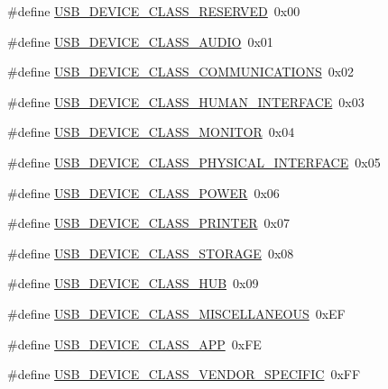 \begin{DoxyCompactItemize}
\item 
\#define \hyperlink{group__USBD__Core_gaca7ece737f3f37b7a6f458fc24864776}{U\-S\-B\-\_\-\-D\-E\-V\-I\-C\-E\-\_\-\-C\-L\-A\-S\-S\-\_\-\-R\-E\-S\-E\-R\-V\-E\-D}~0x00
\item 
\#define \hyperlink{group__USBD__Core_gade360faee3b601af707b65122a46d446}{U\-S\-B\-\_\-\-D\-E\-V\-I\-C\-E\-\_\-\-C\-L\-A\-S\-S\-\_\-\-A\-U\-D\-I\-O}~0x01
\item 
\#define \hyperlink{group__USBD__Core_gab6fd7e18adf5c748a6b56391c1c2b819}{U\-S\-B\-\_\-\-D\-E\-V\-I\-C\-E\-\_\-\-C\-L\-A\-S\-S\-\_\-\-C\-O\-M\-M\-U\-N\-I\-C\-A\-T\-I\-O\-N\-S}~0x02
\item 
\#define \hyperlink{group__USBD__Core_ga3d9e0560a81b4dfd30bbf829960dbfab}{U\-S\-B\-\_\-\-D\-E\-V\-I\-C\-E\-\_\-\-C\-L\-A\-S\-S\-\_\-\-H\-U\-M\-A\-N\-\_\-\-I\-N\-T\-E\-R\-F\-A\-C\-E}~0x03
\item 
\#define \hyperlink{group__USBD__Core_ga23d001aa49fada2019ff3a4886a9f2a5}{U\-S\-B\-\_\-\-D\-E\-V\-I\-C\-E\-\_\-\-C\-L\-A\-S\-S\-\_\-\-M\-O\-N\-I\-T\-O\-R}~0x04
\item 
\#define \hyperlink{group__USBD__Core_ga6053794e5de119b37615ec98f7eceedb}{U\-S\-B\-\_\-\-D\-E\-V\-I\-C\-E\-\_\-\-C\-L\-A\-S\-S\-\_\-\-P\-H\-Y\-S\-I\-C\-A\-L\-\_\-\-I\-N\-T\-E\-R\-F\-A\-C\-E}~0x05
\item 
\#define \hyperlink{group__USBD__Core_ga88a8b2d45b2950ffd5654e4c3b6741ff}{U\-S\-B\-\_\-\-D\-E\-V\-I\-C\-E\-\_\-\-C\-L\-A\-S\-S\-\_\-\-P\-O\-W\-E\-R}~0x06
\item 
\#define \hyperlink{group__USBD__Core_gae6181c6bdb18c0e6491dd189983b6bd2}{U\-S\-B\-\_\-\-D\-E\-V\-I\-C\-E\-\_\-\-C\-L\-A\-S\-S\-\_\-\-P\-R\-I\-N\-T\-E\-R}~0x07
\item 
\#define \hyperlink{group__USBD__Core_ga053d2a9c3c9856ee01589ebb64d2e09b}{U\-S\-B\-\_\-\-D\-E\-V\-I\-C\-E\-\_\-\-C\-L\-A\-S\-S\-\_\-\-S\-T\-O\-R\-A\-G\-E}~0x08
\item 
\#define \hyperlink{group__USBD__Core_gab8167347cb586d3f82a7ad95fa25bc22}{U\-S\-B\-\_\-\-D\-E\-V\-I\-C\-E\-\_\-\-C\-L\-A\-S\-S\-\_\-\-H\-U\-B}~0x09
\item 
\#define \hyperlink{group__USBD__Core_gabd79da65d7f8f58b37e402fa1442831a}{U\-S\-B\-\_\-\-D\-E\-V\-I\-C\-E\-\_\-\-C\-L\-A\-S\-S\-\_\-\-M\-I\-S\-C\-E\-L\-L\-A\-N\-E\-O\-U\-S}~0x\-E\-F
\item 
\#define \hyperlink{group__USBD__Core_ga9b5f0021003a2fc948daf8d0f4768736}{U\-S\-B\-\_\-\-D\-E\-V\-I\-C\-E\-\_\-\-C\-L\-A\-S\-S\-\_\-\-A\-P\-P}~0x\-F\-E
\item 
\#define \hyperlink{group__USBD__Core_ga89b94b8bc3c5fa2ef7151b5d282f22bb}{U\-S\-B\-\_\-\-D\-E\-V\-I\-C\-E\-\_\-\-C\-L\-A\-S\-S\-\_\-\-V\-E\-N\-D\-O\-R\-\_\-\-S\-P\-E\-C\-I\-F\-I\-C}~0x\-F\-F
\end{DoxyCompactItemize}
